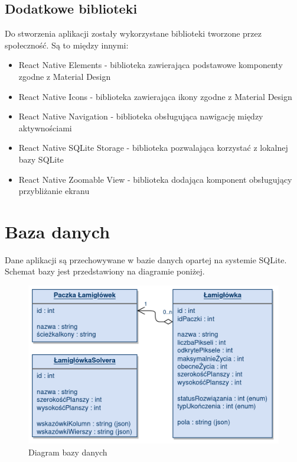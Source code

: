 \subsection{Dodatkowe biblioteki}
	Do stworzenia aplikacji zostały wykorzystane biblioteki tworzone przez społeczność. Są to
między innymi:
\begin{itemize}
	\item React Native Elements \cite{RN-Elements} - biblioteka zawierająca podstawowe komponenty 
zgodne z Material Design
	\item React Native Icons \cite{RN-Icons} - biblioteka zawierająca ikony zgodne z Material Design
	\item React Native Navigation \cite{RN-Navigation} - biblioteka obsługująca nawigację między 
aktywnościami
	\item React Native SQLite Storage \cite{RN-SQLite} - biblioteka pozwalająca korzystać z lokalnej
bazy SQLite
	\item React Native Zoomable View \cite{RN-Zooming} - biblioteka dodająca komponent obsługujący 
przybliżanie ekranu
\end{itemize}


\section{Baza danych}
	Dane aplikacji są przechowywane w bazie danych opartej na systemie SQLite. Schemat bazy jest
przedstawiony na diagramie poniżej.

\begin{figure}[!htb]
    \centering
    \includegraphics[width=\textwidth]{images/db_diagram.png}
    \caption{Diagram bazy danych}
\end{figure}


